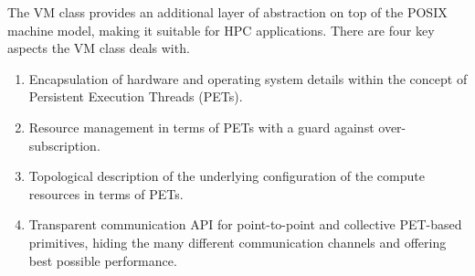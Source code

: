 

The VM class provides an additional layer of abstraction on top of the POSIX machine model, making it suitable for HPC applications. There are four key aspects the VM class deals with.

\begin{enumerate}

\item Encapsulation of hardware and operating system details within the concept of Persistent Execution Threads (PETs).

\item Resource management in terms of PETs with a guard against over-subscription.

\item Topological description of the underlying configuration of the compute resources in terms of PETs.

\item Transparent communication API for point-to-point and collective PET-based primitives, hiding the many different communication channels and offering best possible performance.

\end{enumerate}

\begin{center}
\end{center}


